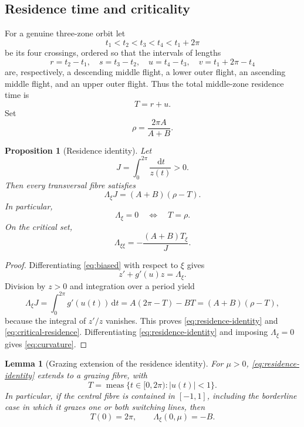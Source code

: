\documentclass[11pt]{article}
\newtheorem{proposition}[theorem]{Proposition}
\newtheorem{lemma}[theorem]{Lemma}
\newcommand{\dd}{\,\mathrm d}
\begin{document}
\subsection{Residence time and criticality}

For a genuine three-zone orbit let
\[
 t_1<t_2<t_3<t_4<t_1+2\pi
\]
be its four crossings, ordered so that the intervals of lengths
\begin{equation}\label{eq:durations}
 r=t_2-t_1,\quad s=t_3-t_2,\quad
 u=t_4-t_3,\quad v=t_1+2\pi-t_4
\end{equation}
are, respectively, a descending middle flight, a lower outer flight, an ascending middle flight, and an upper outer flight.  Thus the total middle-zone residence time is
\[
 T=r+u.
\]
Set
\begin{equation}\label{eq:rho}
 \rho=\frac{2\pi A}{A+B}.
\end{equation}

\begin{proposition}[Residence identity]\label{prop:residence}
Let
\[
 J=\int_0^{2\pi}\frac{\dd t}{z(t)}>0.
\]
Then every transversal fibre satisfies
\begin{equation}\label{eq:residence-identity}
 \Lambda_\xi J=(A+B)(\rho-T).
\end{equation}
In particular,
\begin{equation}\label{eq:critical-residence}
 \Lambda_\xi=0\quad\Longleftrightarrow\quad T=\rho.
\end{equation}
On the critical set,
\begin{equation}\label{eq:curvature}
 \Lambda_{\xi\xi}=-\frac{(A+B)T_\xi}{J}.
\end{equation}
\end{proposition}

\begin{proof}
Differentiating \eqref{eq:biased} with respect to $\xi$ gives
\[
 z'+g'(u)z=\Lambda_\xi.
\]
Division by $z>0$ and integration over a period yield
\[
 \Lambda_\xi J=\int_0^{2\pi}g'(u(t))\dd t
 =A(2\pi-T)-BT=(A+B)(\rho-T),
\]
because the integral of $z'/z$ vanishes.  This proves \eqref{eq:residence-identity} and \eqref{eq:critical-residence}.  Differentiating \eqref{eq:residence-identity} and imposing $\Lambda_\xi=0$ gives \eqref{eq:curvature}.
\end{proof}

\begin{lemma}[Grazing extension of the residence identity]\label{lem:grazing-residence}
For \(\mu>0\), \eqref{eq:residence-identity} extends to a grazing fibre, with
\[
 T=\operatorname{meas}\{t\in[0,2\pi):|u(t)|<1\}.
\]
In particular, if the central fibre is contained in \([-1,1]\), including the
borderline case in which it grazes one or both switching lines, then
\begin{equation}\label{eq:central-grazing-slope}
 T(0)=2\pi,\qquad \Lambda_\xi(0,\mu)=-B.
\end{equation}
\end{lemma}
\end{document}
